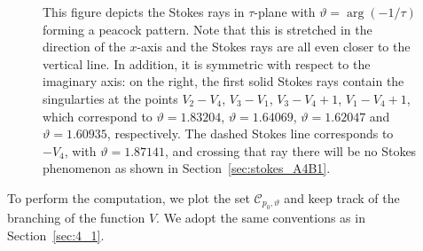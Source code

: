\documentclass[12pt,reqno]{amsart}
\theoremstyle{definition}
\def\BZ{\mathbb Z}
\def\calC{\mathcal C}
\def\Im{\mathrm{Im}}
\def\e{\mathbf e}
\renewcommand{\=}{\;=\;}
\newcommand{\Li}{\operatorname{Li}}
\begin{document}
\begin{figure}[ht]
\begin{tiny}
\begin{tikzpicture}[scale=2]
\end{tikzpicture}
\end{tiny}
\caption{This figure depicts the Stokes rays in $\tau$-plane with $\vartheta=\arg(-1/\tau)$ forming a peacock pattern. Note that this is stretched in the direction of the $x$-axis and the Stokes rays are all even closer to the vertical line. In addition, it is symmetric with respect to the imaginary axis: on the right, the first solid Stokes rays contain the singularties at the points $V_2-V_4$, $V_3-V_1$, $V_3-V_4+1$, $V_1-V_4+1$, which correspond to $\vartheta=1.83204$, $\vartheta=1.64069$, $\vartheta=1.62047$ and $\vartheta=1.60935$, respectively. The dashed Stokes line corresponds to $-V_4$, with $\vartheta=1.87141$, and crossing that ray there will be no Stokes phenomenon as shown in Section~\ref{sec:stokes_A4B1}.}\label{fig:A4B1.stokes}
\end{figure}

\medskip

To perform the computation, we plot the set $\calC_{p_0,\vartheta}$ and keep track of the branching of the function $V$. We adopt the same conventions as in Section~\ref{sec:4_1}. %
\end{document}
